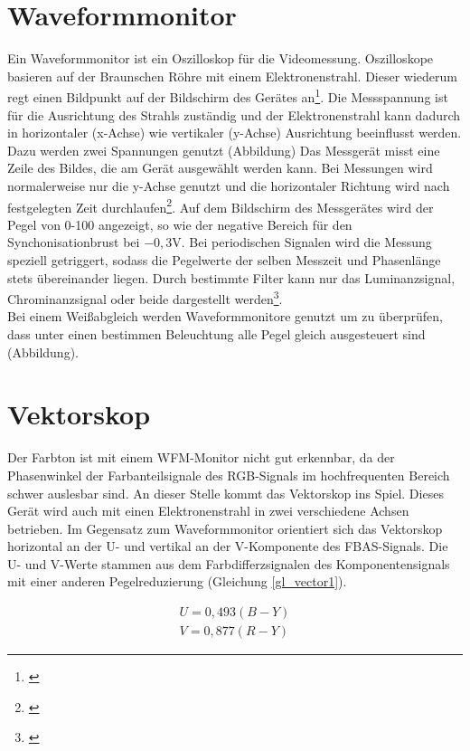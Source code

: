 \section{Waveformmonitor}
\label{sec_wmf}
Ein Waveformmonitor ist ein Oszilloskop für die Videomessung. Oszilloskope basieren auf der Braunschen Röhre mit einem Elektronenstrahl. Dieser wiederum regt einen Bildpunkt auf der Bildschirm des Gerätes an\footnote{\cite[109]{schmidt}}.
Die Messspannung ist für die Ausrichtung des Strahls zuständig und der Elektronenstrahl kann dadurch in horizontaler (x-Achse) wie vertikaler (y-Achse) Ausrichtung beeinflusst werden. Dazu werden zwei Spannungen genutzt (Abbildung) 
Das Messgerät misst eine Zeile des Bildes, die am Gerät ausgewählt werden kann. Bei Messungen wird normalerweise nur die y-Achse genutzt und die horizontaler Richtung wird nach festgelegten Zeit durchlaufen\footnote{\cite[110]{schmidt}}. Auf dem Bildschirm des Messgerätes wird der Pegel von 0-100 angezeigt, so wie der negative Bereich für den Synchonisationbrust bei $-0,3$V. Bei periodischen Signalen wird die Messung speziell getriggert, sodass die Pegelwerte der selben Messzeit und Phasenlänge stets übereinander liegen. Durch bestimmte Filter kann nur das Luminanzsignal, Chrominanzsignal oder beide dargestellt werden\footnote{\cite[111]{schmidt}}.\\
Bei einem Weißabgleich werden Waveformmonitore genutzt um zu überprüfen, dass unter einen bestimmen Beleuchtung alle Pegel gleich ausgesteuert sind (Abbildung).



\section{Vektorskop}
\label{sec_vector}
Der Farbton ist mit einem WFM-Monitor nicht gut erkennbar, da der Phasenwinkel der Farbanteilsignale des RGB-Signals im hochfrequenten Bereich schwer auslesbar sind. An dieser Stelle kommt das Vektorskop ins Spiel. Dieses Gerät wird auch mit einen Elektronenstrahl in zwei verschiedene Achsen betrieben. Im Gegensatz zum Waveformmonitor orientiert sich das Vektorskop horizontal an der U- und vertikal an der V-Komponente des FBAS-Signals. Die U- und V-Werte stammen aus dem Farbdifferzsignalen des Komponentensignals mit einer anderen Pegelreduzierung (Gleichung \ref{gl_vector1}).

\begin{eqnarray}\label{gl_vector1}
	U = 0,493(B-Y)\\
	V = 0,877(R-Y)
\end{eqnarray}

